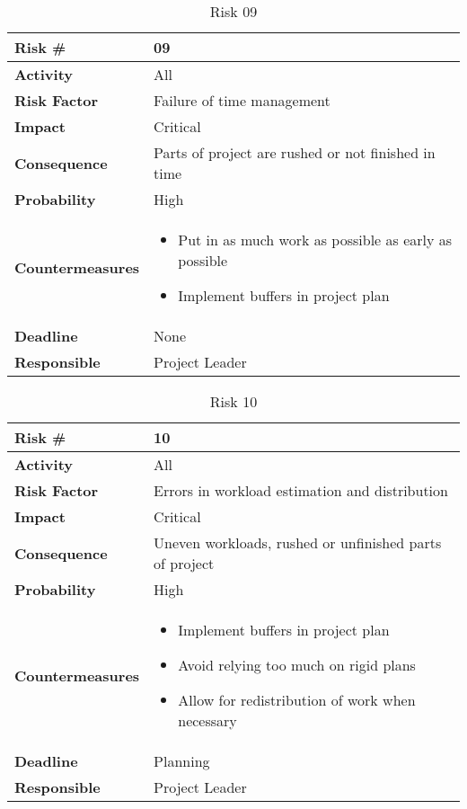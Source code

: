 \medskip

\begin{table}
\begin{tabularx}{\textwidth}{ | l | X | }
\hline
\textbf{Risk \#} & 09 \\ \hline
\textbf{Activity} & All \\ \hline
\textbf{Risk Factor} & Failure of time management \\ \hline
\textbf{Impact} & Critical \\ \hline
\textbf{Consequence} & Parts of project are rushed or not finished in time \\ \hline
\textbf{Probability} & High \\ \hline
\textbf{Countermeasures} & \begin{itemize}
  \item Put in as much work as possible as early as possible
  \item Implement buffers in project plan
\end{itemize}  \\ \hline
\textbf{Deadline} &  None \\ \hline
\textbf{Responsible} & Project Leader \\ \hline
\end{tabularx}
\caption{Risk 09}
\end{table}

\medskip

\begin{table}
\begin{tabularx}{\textwidth}{ | l | X | }
\hline
\textbf{Risk \#} & 10 \\ \hline
\textbf{Activity} & All \\ \hline
\textbf{Risk Factor} & Errors in workload estimation and distribution \\ \hline
\textbf{Impact} & Critical \\ \hline
\textbf{Consequence} & Uneven workloads, rushed or unfinished parts of project \\ \hline
\textbf{Probability} & High \\ \hline
\textbf{Countermeasures} & \begin{itemize}
  \item Implement buffers in project plan
  \item Avoid relying too much on rigid plans
  \item Allow for redistribution of work when necessary
\end{itemize}  \\ \hline
\textbf{Deadline} &  Planning \\ \hline
\textbf{Responsible} & Project Leader \\ \hline
\end{tabularx}
\caption{Risk 10}
\end{table}

